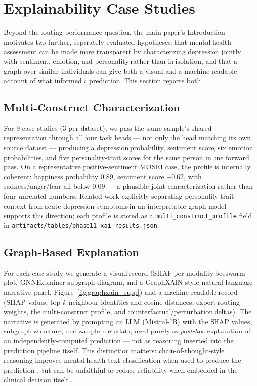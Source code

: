 \documentclass[letterpaper]{article}
\begin{document}
\section{Explainability Case Studies}
\label{sec:xai_supp}

Beyond the routing-performance question, the main paper's Introduction motivates two further, separately-evaluated hypotheses: that mental health assessment can be made more transparent by characterizing depression jointly with sentiment, emotion, and personality rather than in isolation, and that a graph over similar individuals can give both a visual and a machine-readable account of what informed a prediction. This section reports both.

\subsection{Multi-Construct Characterization}

For 9 case studies (3 per dataset), we pass the same sample's shared representation through all four task heads — not only the head matching its own source dataset — producing a depression probability, sentiment score, six emotion probabilities, and five personality-trait scores for the same person in one forward pass. On a representative positive-sentiment MOSEI case, the profile is internally coherent: happiness probability 0.89, sentiment score $+0.62$, with sadness/anger/fear all below 0.09 — a plausible joint characterization rather than four unrelated numbers. Related work explicitly separating personality-trait context from acute depression symptoms in an interpretable graph model \citep{vyalla2026psygat} supports this direction; each profile is stored as a \texttt{multi\_construct\_profile} field in \texttt{artifacts/tables/phase11\_xai\_results.json}.

\subsection{Graph-Based Explanation}

For each case study we generate a visual record (SHAP per-modality beeswarm plot, GNNExplainer subgraph diagram, and a GraphXAIN-style \citep{cedro2024graphxain} natural-language narrative panel, Figure~\ref{fig:graphxain_supp}) and a machine-readable record (SHAP values, top-$k$ neighbour identities and cosine distances, expert routing weights, the multi-construct profile, and counterfactual/perturbation deltas). The narrative is generated by prompting an LLM (Mistral-7B) with the SHAP values, subgraph structure, and sample metadata, used purely as \emph{post-hoc} explanation of an independently-computed prediction — not as reasoning inserted into the prediction pipeline itself. This distinction matters: chain-of-thought-style reasoning improves mental-health text classification when used to produce the prediction \citep{patil2025cognitivemental}, but can be unfaithful or reduce reliability when embedded in the clinical decision itself \citep{wu2025cotfails}.
\end{document}
